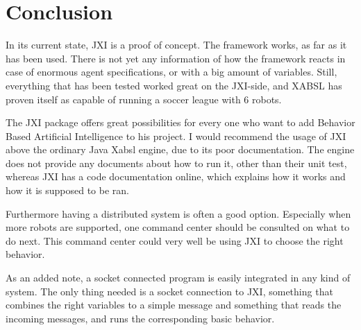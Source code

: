 \documentclass[a4paper,10pt]{article}
\begin{document}
\section{Conclusion}
In its current state, JXI is a proof of concept. The framework works, as far as
it has been used. There is not yet any information of how the framework reacts
in case of enormous agent specifications, or with a big amount of variables.
Still, everything that has been tested worked great on the JXI-side, and XABSL
has proven itself as capable of running a soccer league with 6 robots. 

The JXI package offers great possibilities for every one who want to add
Behavior Based Artificial Intelligence to his project. I would recommend the
usage of JXI above the ordinary Java Xabsl engine, due to its poor
documentation. The engine does not provide any documents about how to run it,
other than their unit test, whereas JXI has a code documentation online, which
explains how it works and how it is supposed to be ran. 

Furthermore having a distributed system is often a good option. Especially when
more robots are supported, one command center should be consulted on what to do
next. This command center could very well be using JXI to choose the right
behavior.

As an added note, a socket connected program is easily integrated in any kind of
system. The only thing needed is a socket connection to JXI, something that
combines the right variables to a simple message and something that reads the
incoming messages, and runs the corresponding basic behavior. 
\end{document}
